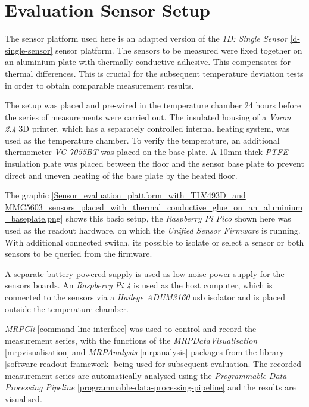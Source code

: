 \hypertarget{evaluation-sensor-setup}{%
\section{Evaluation Sensor Setup}\label{evaluation-sensor-setup}}

The sensor platform used here is an adapted version of the \emph{1D:
Single Sensor} \ref{d-single-sensor} sensor platform. The sensors to be
measured were fixed together on an aluminium plate with thermally
conductive adhesive. This compensates for thermal differences. This is
crucial for the subsequent temperature deviation tests in order to
obtain comparable measurement results.

The setup was placed and pre-wired in the temperature chamber 24 hours
before the series of measurements were carried out. The insulated
housing of a \emph{Voron 2.4} 3D printer, which has a separately
controlled internal heating system, was used as the temperature chamber.
To verify the temperature, an additional thermometer \emph{VC-7055BT}
was placed on the base plate. A 10mm thick \emph{PTFE} insulation plate
was placed between the floor and the sensor base plate to prevent direct
and uneven heating of the base plate by the heated floor.

The graphic
\ref{Sensor_evaluation_plattform_with_TLV493D_and MMC5603_sensors_placed_with_thermal_conductive_glue_on_an_aluminium_baseplate.png}
shows this basic setup, the \emph{Raspberry Pi Pico} shown here was used
as the readout hardware, on which the \emph{Unified Sensor Firmware} is
running. With additional connected switch, its possible to isolate or
select a sensor or both sensors to be queried from the firmware.

A separate battery powered supply is used as low-noise power supply for
the sensors boards. An \emph{Raspberry Pi 4} is used as the host
computer, which is connected to the sensors via a \emph{Hailege
ADUM3160} \gls{usb} isolator and is placed outside the temperature
chamber.

\emph{MRPCli} \ref{command-line-interface} was used to control and
record the measurement series, with the functions of the
\emph{MRPDataVisualisation} \ref{mrpvisualisation} and
\emph{MRPAnalysis} \ref{mrpanalysis} packages from the library
\ref{software-readout-framework} being used for subsequent evaluation.
The recorded measurement series are automatically analysed using the
\emph{Programmable-Data Processing Pipeline}
\ref{programmable-data-processing-pipeline} and the results are
visualised.

